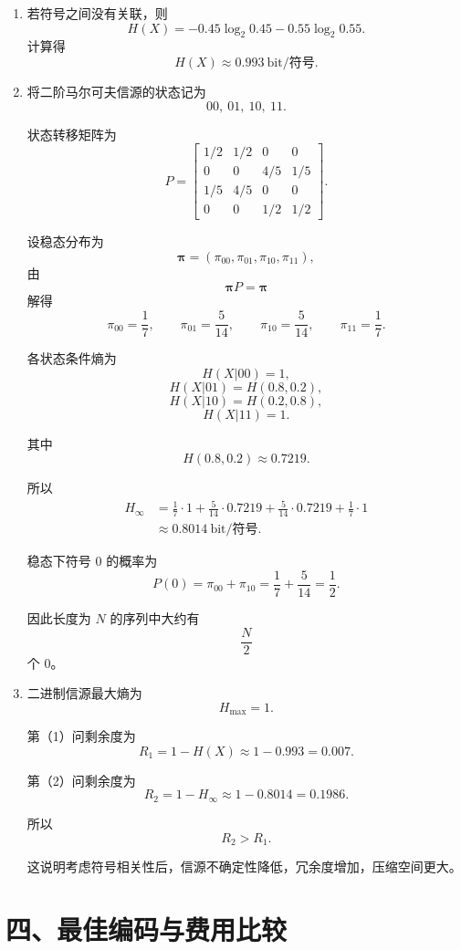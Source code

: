 \documentclass[UTF8,a4paper,12pt]{ctexart}
\begin{document}
\begin{enumerate}[label=\arabic*., leftmargin=2em]
\item 若符号之间没有关联，则
\[
H(X)=-0.45\log_2 0.45-0.55\log_2 0.55.
\]
计算得
\[
H(X)\approx 0.993\ \text{bit/符号}.
\]

\item 将二阶马尔可夫信源的状态记为
\[
00,\ 01,\ 10,\ 11.
\]

状态转移矩阵为
\[
P=
\begin{bmatrix}
1/2&1/2&0&0\\
0&0&4/5&1/5\\
1/5&4/5&0&0\\
0&0&1/2&1/2
\end{bmatrix}.
\]

设稳态分布为
\[
\boldsymbol{\pi}=(\pi_{00},\pi_{01},\pi_{10},\pi_{11}),
\]
由
\[
\boldsymbol{\pi}P=\boldsymbol{\pi}
\]
解得
\[
\pi_{00}=\frac17,\qquad
\pi_{01}=\frac{5}{14},\qquad
\pi_{10}=\frac{5}{14},\qquad
\pi_{11}=\frac17.
\]

各状态条件熵为
\[
H(X|00)=1,
\]
\[
H(X|01)=H(0.8,0.2),
\]
\[
H(X|10)=H(0.2,0.8),
\]
\[
H(X|11)=1.
\]

其中
\[
H(0.8,0.2)\approx 0.7219.
\]

所以
\[
\begin{aligned}
H_\infty
&=\frac17\cdot 1+\frac{5}{14}\cdot 0.7219
+\frac{5}{14}\cdot 0.7219+\frac17\cdot 1\\
&\approx 0.8014\ \text{bit/符号}.
\end{aligned}
\]

稳态下符号 $0$ 的概率为
\[
P(0)=\pi_{00}+\pi_{10}
=\frac17+\frac{5}{14}
=\frac12.
\]

因此长度为 $N$ 的序列中大约有
\[
\frac N2
\]
个 $0$。

\item 二进制信源最大熵为
\[
H_{\max}=1.
\]

第（1）问剩余度为
\[
R_1=1-H(X)\approx 1-0.993=0.007.
\]

第（2）问剩余度为
\[
R_2=1-H_\infty\approx 1-0.8014=0.1986.
\]

所以
\[
R_2>R_1.
\]

这说明考虑符号相关性后，信源不确定性降低，冗余度增加，压缩空间更大。
\end{enumerate}

\section*{四、最佳编码与费用比较}
\end{document}
